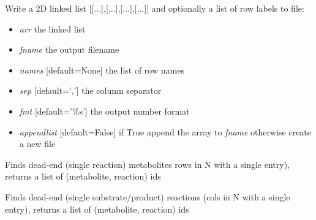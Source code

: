 \documentclass[a4paper,11pt,english]{sphinxmanual}
\begin{document}
\begin{fulllineitems}
\label{modules_doc:cbmpy.CBTools.exportLabelledLinkedList}
Write a 2D linked list {[}{[}...{]},{[}...{]},{[}...{]},{[}...{]}{]} and optionally a list of row labels to file:
\begin{itemize}
\item {} 
\emph{arr} the linked list

\item {} 
\emph{fname} the output filename

\item {} 
\emph{names} {[}default=None{]} the list of row names

\item {} 
\emph{sep} {[}default=','{]} the column separator

\item {} 
\emph{fmt} {[}default='\%s'{]} the output number format

\item {} 
\emph{appendlist} {[}default=False{]} if True append the array to \emph{fname} otherwise create a new file

\end{itemize}

\end{fulllineitems}


\begin{fulllineitems}
\label{modules_doc:cbmpy.CBTools.findDeadEndMetabolites}
Finds dead-end (single reaction) metabolites rows in N with a single entry), returns a list of (metabolite, reaction) ids

\end{fulllineitems}


\begin{fulllineitems}
\label{modules_doc:cbmpy.CBTools.findDeadEndReactions}
Finds dead-end (single substrate/product) reactions (cols in N with a single entry), returns a list of (metabolite, reaction) ids

\end{fulllineitems}
\end{document}
